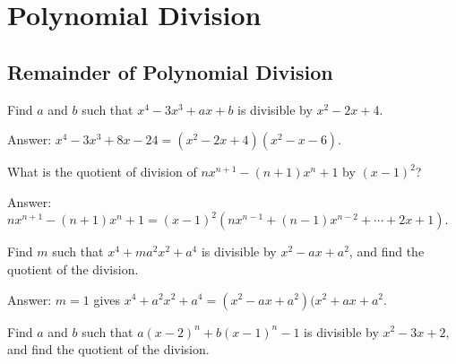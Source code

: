 \documentclass[12pt,a4paper]{memoir}
\theoremstyle{definition}
\begin{document}
\newpage
% 
\section{Polynomial Division}

\subsection{Remainder of Polynomial Division}


\begin{tcolorbox}
	\begin{question}
		Find $a$ and $b$ such that $x^4-3x^3+ax+b$ is divisible by $x^2-2x+4$.
	\end{question}
\end{tcolorbox}

\begin{solution}[name=Solution by Parviz Shahriari]
	Answer: $x^4-3x^3+8x-24 = (x^2-2x+4)(x^2-x-6)$.
\end{solution}

\begin{tcolorbox}
	\begin{question}
		What is the quotient of division of $nx^{n+1}-(n+1)x^n+1$ by $(x-1)^2$?
	\end{question}
\end{tcolorbox}

\begin{solution}[name=Solution by Parviz Shahriari]
	Answer: $nx^{n+1}-(n+1)x^n+1 = (x-1)^2\left(nx^{n-1}+(n-1)x^{n-2}+\cdots+2x+1\right)$.
\end{solution}


\begin{tcolorbox}
	\begin{question}
		Find $m$ such that $x^4+ma^2x^2+a^4$ is divisible by $x^2-ax+a^2$, and find the quotient of the division.
	\end{question}
\end{tcolorbox}

\begin{solution}[name=Solution by Parviz Shahriari]
	Answer: $m=1$ gives $x^4+a^2x^2+a^4 = (x^2-ax+a^2)(x^2+ax+a^2$.
\end{solution}



\begin{tcolorbox}
	\begin{question}
		Find $a$ and $b$ such that $a(x-2)^n+b(x-1)^n-1$ is divisible by $x^2-3x+2$, and find the quotient of the division.
	\end{question}
\end{tcolorbox}
\end{document}
